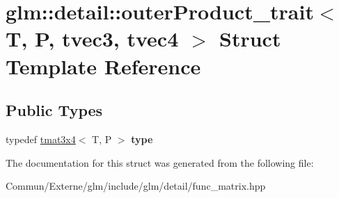 \hypertarget{structglm_1_1detail_1_1outer_product__trait_3_01_t_00_01_p_00_01tvec3_00_01tvec4_01_4}{}\section{glm\+:\+:detail\+:\+:outer\+Product\+\_\+trait$<$ T, P, tvec3, tvec4 $>$ Struct Template Reference}
\label{structglm_1_1detail_1_1outer_product__trait_3_01_t_00_01_p_00_01tvec3_00_01tvec4_01_4}
\subsection*{Public Types}
\begin{DoxyCompactItemize}
\item 
typedef \hyperlink{structglm_1_1detail_1_1tmat3x4}{tmat3x4}$<$ T, P $>$ {\bfseries type}\hypertarget{structglm_1_1detail_1_1outer_product__trait_3_01_t_00_01_p_00_01tvec3_00_01tvec4_01_4_a14958bc1241fffaf223abab70496c56d}{}\label{structglm_1_1detail_1_1outer_product__trait_3_01_t_00_01_p_00_01tvec3_00_01tvec4_01_4_a14958bc1241fffaf223abab70496c56d}

\end{DoxyCompactItemize}


The documentation for this struct was generated from the following file\+:\begin{DoxyCompactItemize}
\item 
Commun/\+Externe/glm/include/glm/detail/func\+\_\+matrix.\+hpp\end{DoxyCompactItemize}

